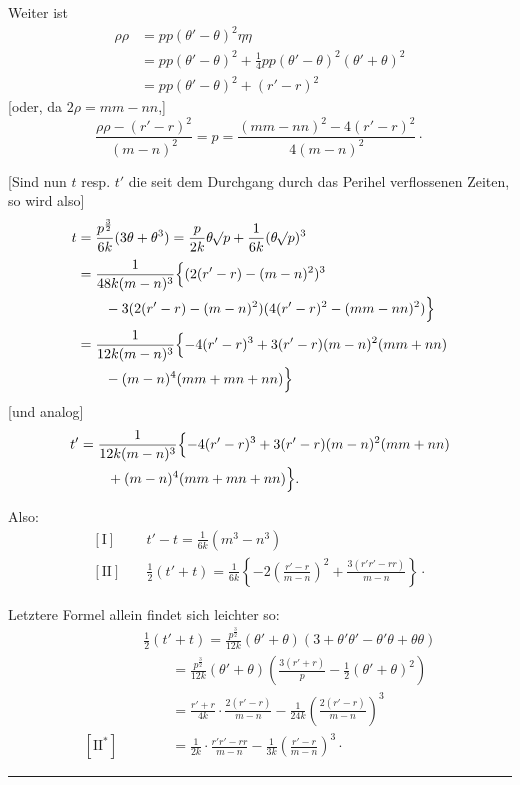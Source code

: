 Weiter ist
\[
\begin{aligned}
\rho\rho&=pp(\theta'-\theta)^2\eta\eta\\
&=pp(\theta'-\theta)^2+\tfrac{1}{4}pp(\theta'-\theta)^2(\theta'+\theta)^2\\
&=pp(\theta'-\theta)^2+(r'-r)^2
\end{aligned}
\]
[oder, da \(2\rho=mm-nn\),]
\[
\frac{\rho\rho-(r'-r)^2}{(m-n)^2}=p=\frac{(mm-nn)^2-4(r'-r)^2}{4(m-n)^2}\mathpunct{\cdot}
\]

[Sind nun \(t\) resp. \(t'\) die seit dem Durchgang durch das Perihel verflossenen Zeiten, so wird also]
\[
\begin{aligned}
t&=\frac{p^{\frac{3}{2}}}{6k}(3\theta+\theta^3)=\frac{p}{2k}\theta\mathord{{}^{}\!\surd}p+\frac{1}{6k}(\theta\mathord{{}^{}\!\surd}p)^3\\[.5ex]
&=\frac{1}{48k(m-n)^3}\Bigl\{(2(r'-r)-(m-n)^2)^3\\
&\qquad-3(2(r'-r)-(m-n)^2)(4(r'-r)^2-(mm-nn)^2)\Bigr\}\\[.5ex]
&=\frac{1}{12k(m-n)^3}\Bigl\{-4(r'-r)^3+3(r'-r)(m-n)^2(mm+nn)\\
&\qquad-(m-n)^4(mm+mn+nn)\Bigr\}
\end{aligned}
\]
[und analog]
\[
\begin{aligned}
t'&=\frac{1}{12k(m-n)^3}\Bigl\{-4(r'-r)^3+3(r'-r)(m-n)^2(mm+nn)\\
&\qquad+(m-n)^4(mm+mn+nn)\Bigr\}.
\end{aligned}
\]

Also:
\[
\begin{aligned}
\mathrm{[I]}\quad&t'-t=\frac{1}{6k}(m^3-n^3)\\[1ex]
\mathrm{[II]}\quad&\tfrac{1}{2}(t'+t)=\frac{1}{6k}\left\{-2\left(\frac{r'-r}{m-n}\right)^2+\frac{3(r'r'-rr)}{m-n}\right\}\mathpunct{\cdot}
\end{aligned}
\]

Letztere Formel allein findet sich leichter so:
\[
\begin{aligned}
&\tfrac{1}{2}(t'+t)=\frac{p^{\frac{3}{2}}}{12k}(\theta'+\theta)(3+\theta'\theta'-\theta'\theta+\theta\theta)\\
&\qquad=\frac{p^{\frac{3}{2}}}{12k}(\theta'+\theta)\left(\frac{3(r'+r)}{p}-\tfrac{1}{2}(\theta'+\theta)^2\right)\\[.5ex]
&\qquad=\frac{r'+r}{4k}\cdot\frac{2(r'-r)}{m-n}-\frac{1}{24k}\left(\frac{2(r'-r)}{m-n}\right)^3\\[.5ex]
\mathrm{[II^{*}]}\quad&\qquad=\frac{1}{2k}\cdot\frac{r'r'-rr}{m-n}-\frac{1}{3k}\left(\frac{r'-r}{m-n}\right)^3\mathpunct{\cdot}
\end{aligned}
\]
\begin{center}\rule{.3\linewidth}{.4pt}\end{center}
